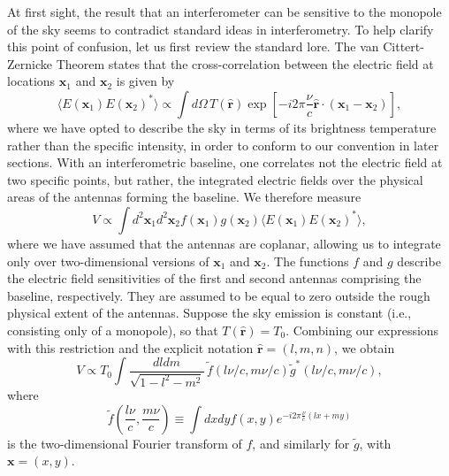 \documentclass[twocolumn,apj,numberedappendix]{emulateapj}
\newcommand{\rhat}{\hat{\mathbf{r}}}
\begin{document}
At first sight, the result that an interferometer can be sensitive to the monopole of the sky seems to contradict standard ideas in interferometry. To help clarify this point of confusion,
let us first review the standard lore. The van Cittert-Zernicke Theorem states that the cross-correlation
between the electric field at locations $\mathbf{x}_1$ and $\mathbf{x}_2$ is given by
\begin{equation}
\langle E(\mathbf{x}_1) E(\mathbf{x}_2)^* \rangle \propto \int d\Omega \, T(\rhat) \exp \left[ - i 2\pi \frac{\nu}{c} \rhat \cdot (\mathbf{x}_1 - \mathbf{x}_2 ) \right],
\end{equation}
where we have opted to describe the sky in terms of its brightness temperature rather than the specific intensity, in order to conform to our convention in later sections. With an interferometric baseline, one correlates
not the electric field at two specific points, but rather, the integrated electric fields over the physical
areas of the antennas forming the baseline. We therefore measure
\begin{equation}
V \propto \int d^2 \mathbf{x}_1 d^2 \mathbf{x}_2 f (\mathbf{x}_1) g(\mathbf{x}_2) \langle E(\mathbf{x}_1) E(\mathbf{x}_2)^* \rangle,
\end{equation}
where we have assumed that the antennas are coplanar, allowing us to integrate only over two-dimensional
versions of $\mathbf{x}_1$ and $\mathbf{x}_2$. The functions $f$ and $g$ describe the electric field sensitivities of the first and second antennas comprising the baseline, respectively. They are assumed to be equal to zero outside the rough physical extent of the
antennas. Suppose the sky emission is constant (i.e., consisting only of a monopole), so that $T(\rhat) = T_0$. Combining our expressions with this restriction and the explicit notation $\rhat = (l,m,n)$, we obtain
\begin{equation}
V \propto T_0 \int \frac{dl dm}{\sqrt{1- l^2 - m^2}} \,\tilde{f}\!\left( l \nu / c , m \nu / c \right) \tilde{g}^* ( l \nu / c , m \nu / c ),
\end{equation}
where
\begin{equation}
\tilde{f}\left( \frac{l \nu}{c}, \frac{m \nu}{c}  \right) \equiv \int dx dy f(x,y)e^{ - i 2 \pi \frac{\nu}{c} (lx + my)}
\end{equation}
is the two-dimensional Fourier transform of $f$, and similarly for $\tilde{g}$, with $\mathbf{x} = (x,y)$.
\end{document}
